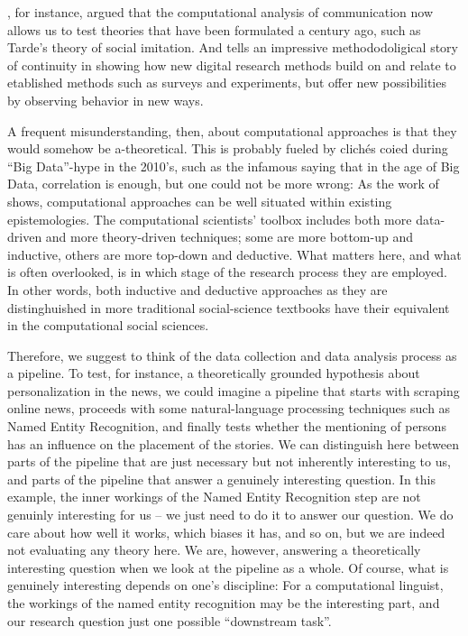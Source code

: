 \citet{Gonzalez-Bailon2017}, for instance, argued that the
computational analysis of communication now allows us to test theories
that have been formulated a century ago, such as Tarde's theory of
social imitation. And \citet{Salganik2019} tells an impressive
methododoligical story of continuity in showing how new digital
research methods build on and relate to etablished methods such as
surveys and experiments, but offer new possibilities by observing
behavior in new ways.

A frequent misunderstanding, then, about computational approaches is
that they would somehow be a-theoretical. This is probably fueled by
clich\'{e}s coied during ``Big Data''-hype in the 2010's, such as the
infamous saying that in the age of Big Data, correlation is enough,
but one could not be more wrong: As the work of \cite{Kitchin2014,Kitchin2014data} shows, computational approaches can
be well situated within existing epistemologies. The computational
scientists' toolbox includes both more data-driven and more
theory-driven techniques; some are more bottom-up and inductive,
others are more top-down and deductive. What matters here, and what is
often overlooked, is in which stage of the research process they are
employed. In other words, both inductive and deductive approaches as
they are distinghuished in more traditional social-science textbooks
\citep[e.g.,][]{Bryman2012} have their equivalent in the computational
social sciences.

Therefore, we suggest to think of the data collection and data
analysis process as a pipeline. To test, for instance, a theoretically
grounded hypothesis about personalization in the news, we could
imagine a pipeline that starts with scraping online news, proceeds
with some natural-language processing techniques such as Named Entity
Recognition, and finally tests whether the mentioning of persons has
an influence on the placement of the stories. We can distinguish here
between parts of the pipeline that are just necessary but not
inherently interesting to us, and parts of the pipeline that answer a
genuinely interesting question. In this example, the inner workings of
the Named Entity Recognition step are not genuinly interesting for us
-- we just need to do it to answer our question. We do care about how
well it works, which biases it has, and so on, but we are indeed not
evaluating any theory here. We are, however, answering a theoretically
interesting question when we look at the pipeline as a whole.  Of course, what is genuinely interesting depends on one's discipline: For a
computational linguist, the workings of the named entity recognition
may be the interesting part, and our research question just one
possible ``downstream task''.

